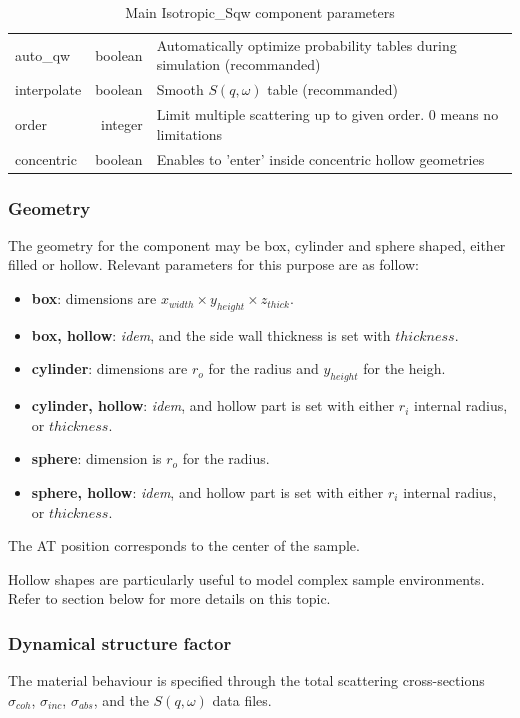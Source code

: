 \begin{table}
\begin{center}
{\begin{tabular}{|lr|p{}|}
auto\_qw  & boolean & Automatically optimize probability tables during simulation (recommanded)  \\
interpolate & boolean & Smooth $S(q,\omega)$ table (recommanded) \\
order     & integer & Limit multiple scattering up to given order. 0 means no limitations  \\
concentric& boolean & Enables to 'enter' inside concentric hollow geometries  \\
    \hline
    \end{tabular}
    \caption{Main Isotropic\_Sqw component parameters}
    \label{t:sqw-param}
  }
  \end{center}
\end{table}

\subsubsection{Geometry}

The geometry for the component may be box, cylinder and sphere shaped, either filled or hollow. Relevant parameters for this purpose are as follow:
\begin{itemize}
\item {\bf box}: dimensions are $x_{width} \times y_{height} \times z_{thick}$.
\item {\bf box, hollow}: \emph{idem}, and the side wall thickness is set with $thickness$.
\item {\bf cylinder}: dimensions are $r_o$ for the radius and $y_{height}$ for the heigh.
\item {\bf cylinder, hollow}: \emph{idem}, and hollow part is set with either $r_i$ internal radius, or $thickness$.
\item {\bf sphere}: dimension is $r_o$ for the radius.
\item {\bf sphere, hollow}: \emph{idem}, and hollow part is set with either $r_i$ internal radius, or $thickness$.
\end{itemize}
The AT position corresponds to the center of the sample.

Hollow shapes are particularly useful to model complex sample environments. Refer to section below for more details on this topic.

\subsubsection{Dynamical structure factor}

The material behaviour is specified through the total scattering cross-sections $\sigma_{coh}$, $\sigma_{inc}$, $\sigma_{abs}$, and the $S(q, \omega)$ data files.


